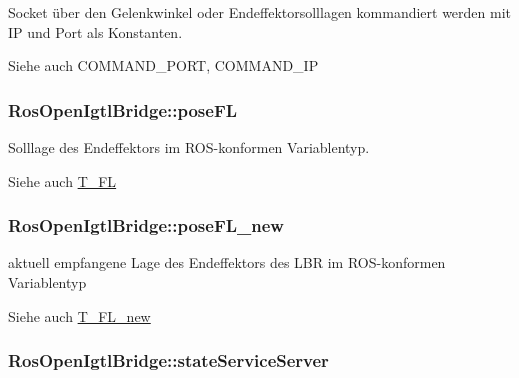Socket über den Gelenkwinkel oder Endeffektorsolllagen kommandiert werden mit I\-P und Port als Konstanten. 

\begin{DoxySeeAlso}{Siehe auch}
C\-O\-M\-M\-A\-N\-D\-\_\-\-P\-O\-R\-T, C\-O\-M\-M\-A\-N\-D\-\_\-\-I\-P 
\end{DoxySeeAlso}
\hypertarget{classRosOpenIgtlBridge_a43a57e8fe72fa4a233b744a3576310da}{
\subsubsection[{pose\-F\-L}]{\setlength{\rightskip}{0pt plus 5cm}Ros\-Open\-Igtl\-Bridge\-::pose\-F\-L\hspace{0.3cm}{\ttfamily [private]}}}\label{classRosOpenIgtlBridge_a43a57e8fe72fa4a233b744a3576310da}


Solllage des Endeffektors im R\-O\-S-\/konformen Variablentyp. 

\begin{DoxySeeAlso}{Siehe auch}
\hyperlink{classRosOpenIgtlBridge_a8dbc016aacf3ff2caad058ec50a96e77}{T\-\_\-\-F\-L} 
\end{DoxySeeAlso}
\hypertarget{classRosOpenIgtlBridge_afee0e87dfe158f8980081554b3f8dac2}{
\subsubsection[{pose\-F\-L\-\_\-new}]{\setlength{\rightskip}{0pt plus 5cm}Ros\-Open\-Igtl\-Bridge\-::pose\-F\-L\-\_\-new\hspace{0.3cm}{\ttfamily [private]}}}\label{classRosOpenIgtlBridge_afee0e87dfe158f8980081554b3f8dac2}


aktuell empfangene Lage des Endeffektors des L\-B\-R im R\-O\-S-\/konformen Variablentyp 

\begin{DoxySeeAlso}{Siehe auch}
\hyperlink{classRosOpenIgtlBridge_ace49281b853f92fbd9decbaa2dcd5b70}{T\-\_\-\-F\-L\-\_\-new} 
\end{DoxySeeAlso}
\hypertarget{classRosOpenIgtlBridge_ad7c6b0430970a8faf6cc9e934d6f889e}{
\subsubsection[{state\-Service\-Server}]{\setlength{\rightskip}{0pt plus 5cm}Ros\-Open\-Igtl\-Bridge\-::state\-Service\-Server\hspace{0.3cm}{\ttfamily [private]}}}\label{classRosOpenIgtlBridge_ad7c6b0430970a8faf6cc9e934d6f889e}


